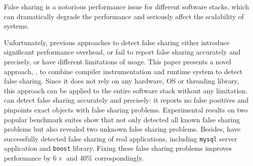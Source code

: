 
\begin{comment}
False sharing is notorious for performance degradation in multithreaded
programs. It apprears when two or more threads running on different cores periodically access 
different portions of data that can fit into one cache line. Since caching
system in a multicore processor needs to ensure a coherent view of memory
accross all cores, it has to grant an exclusive access
for each write operation by invidating duplicate copies in other cores. As a
result, frequent cache invalidation can seriously affect the scalability and
performance of multithreaded programs.
\end{comment} 

False sharing is a notorious performance issue for different software stacks, 
which can dramatically degrade the performance and seriously affect the scalability of 
systems.

Unfortunately, previous approaches to detect false sharing
either introduce significant performance overhead, or fail
to report false sharing accurately and precisely, or have different limitations of usage. 
This paper presents a novel approach, \Predator{}, to combine compiler instrumentation
and runtime system to detect false sharing. 
Since it does not rely on any hardware, OS or threading library, this approach can be
applied to the entire software stack without any limitation. 
\Predator{} can detect false sharing accurately and precisely: it reports no 
false positives and pinpoints exact objects with false sharing problems.
Experimental results on two popular benchmark suites 
show that \Predator{} not only detected all known false sharing problems but also revealed 
two unknown false sharing problems.
Besides, \Predator{} have successfully detected false sharing of real applications,
including \texttt{mysql} server application and \texttt{boost} library. Fixing these
false sharing problems improves performance by $6\times$ and $40\%$ correspondingly.


